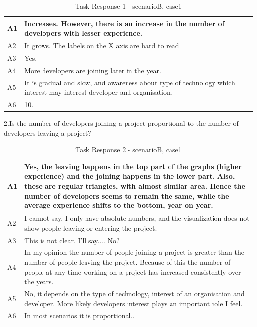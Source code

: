 \documentclass[seploa]{beavtex}
\begin{document}
\begin{table}[H]
\begin{tabular}{ |p{2cm}|p{12cm}| }
 \hline
 A1 & Increases. However, there is an increase in the number of developers with lesser experience.\\
 \hline
 A2 & It grows. The labels on the X axis are hard to read
\\ \hline
 A3 & Yes.\\ \hline
 A4 & More developers are joining later in the year.\\ \hline
 A5 & It is gradual and slow, and awareness about type of technology which interest may interest developer and organisation.\\ \hline
 A6 & 10.\\
 \hline
\end{tabular}
\caption{Task Response 1 - scenarioB, case1}
\label{tab:table21}
\end{table}


2.Is the number of developers joining a project proportional to the number of developers leaving a project?	

\begin{table}[H]
\begin{tabular}{ |p{2cm}|p{12cm}| }
 \hline
 A1 & Yes, the leaving happens in the top part of the graphs (higher experience) and the joining happens in the lower part. Also, these are regular triangles, with almost similar area. Hence the number of developers seems to remain the same, while the average experience shifts to the bottom, year on year.\\
 \hline
 A2 & I cannot say. I only have absolute numbers, and the visualization does not show people leaving or entering the project.\\ \hline
 A3 & This is not clear. I'll say.... No?\\ \hline
 A4 & In my opinion the number of people joining a project is greater than the number of people leaving the project. Because of this the number of people at any time working on a project has increased consistently over the years.\\ \hline
 A5 & No, it depends on the type of technology, interest of an organisation and developer. More likely developers interest plays an important role I feel.\\ \hline
 A6 & In most scenarios it is proportional..\\
 \hline
\end{tabular}
\caption{Task Response 2 - scenarioB, case1}
\label{tab:table22}
\end{table}
\end{document}

